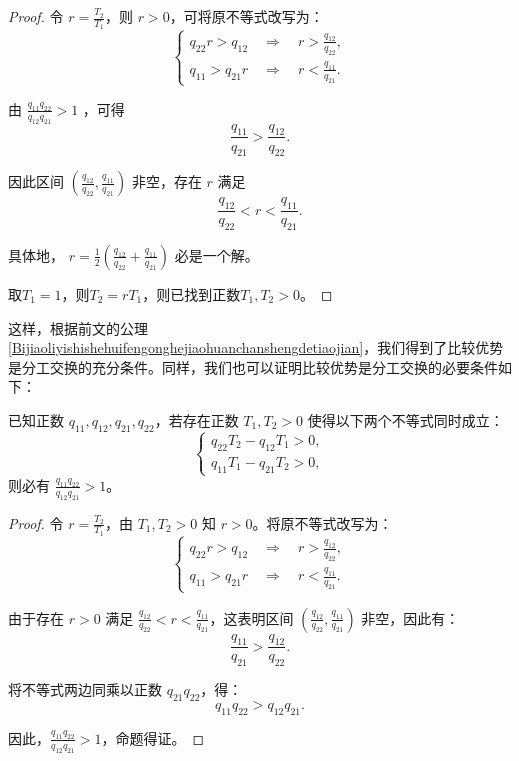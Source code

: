 \begin{proof}
    令 $ r = \frac{T_2}{T_1} $，则 $ r > 0 $，可将原不等式改写为：
    $$
    \begin{cases}
        q_{22}r > q_{12} \quad \Rightarrow \quad r > \frac{q_{12}}{q_{22}}, \\
        q_{11} > q_{21}r \quad \Rightarrow \quad r < \frac{q_{11}}{q_{21}}.
    \end{cases}
    $$

    由 $\frac{q_{11}q_{22}}{q_{12}q_{21}} > 1$ ，可得
    $$
        \frac{q_{11}}{q_{21}} > \frac{q_{12}}{q_{22}}.
    $$

    因此区间 $\left( \frac{q_{12}}{q_{22}}, \frac{q_{11}}{q_{21}} \right)$ 非空，存在 $ r $ 满足
    $$
        \frac{q_{12}}{q_{22}} < r < \frac{q_{11}}{q_{21}}.
    $$

    具体地， $r = \frac{1}{2}\left( \frac{q_{12}}{q_{22}} + \frac{q_{11}}{q_{21}} \right)$ 必是一个解。

    取$T_1 = 1$，则$T_2 =  r T_1$，则已找到正数$T_1,T_2 > 0$。
\end{proof}

这样，根据前文的公理\ref{Bijiaoliyishishehuifengonghejiaohuanchanshengdetiaojian}，我们得到了比较优势是分工交换的充分条件。同样，我们也可以证明比较优势是分工交换的必要条件如下：

\begin{proposition}
    已知正数 $ q_{11}, q_{12}, q_{21}, q_{22} $，若存在正数 $ T_1, T_2 > 0 $ 使得以下两个不等式同时成立：
    $$
        \begin{cases}
            q_{22}T_2 - q_{12}T_1 > 0, \\
            q_{11}T_1 - q_{21}T_2 > 0,
        \end{cases}
    $$
    则必有 $\displaystyle \frac{q_{11}q_{22}}{q_{12}q_{21}} > 1$。
\end{proposition}

\begin{proof}
    令 $ r = \frac{T_2}{T_1} $，由 $ T_1, T_2 > 0 $ 知 $ r > 0 $。将原不等式改写为：
    $$
        \begin{cases}
            q_{22}r > q_{12} \quad \Rightarrow \quad r > \frac{q_{12}}{q_{22}}, \\
            q_{11} > q_{21}r \quad \Rightarrow \quad r < \frac{q_{11}}{q_{21}}.
        \end{cases}
    $$

    由于存在 $ r > 0 $ 满足 $\frac{q_{12}}{q_{22}} < r < \frac{q_{11}}{q_{21}}$，这表明区间 $\left( \frac{q_{12}}{q_{22}}, \frac{q_{11}}{q_{21}} \right)$ 非空，因此有：
    $$
        \frac{q_{11}}{q_{21}} > \frac{q_{12}}{q_{22}}.
    $$

    将不等式两边同乘以正数 $ q_{21}q_{22} $，得：
    $$
        q_{11}q_{22} > q_{12}q_{21}.
    $$

    因此，$\displaystyle \frac{q_{11}q_{22}}{q_{12}q_{21}} > 1$，命题得证。

\end{proof}

